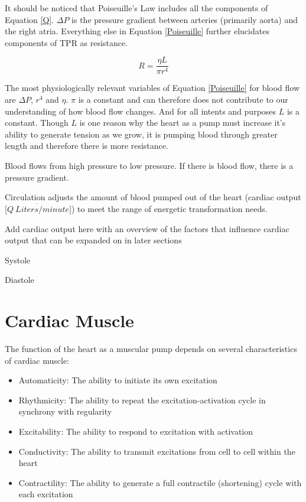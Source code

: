 It should be noticed that Poiseuille's Law includes all the components of Equation \ref{Q}. $\Delta P$ is the pressure gradient between arteries (primarily aorta) and the right atria. Everything else in Equation \ref{Poiseuille} further elucidates components of TPR as resistance.

\begin{equation}
    R = \frac{\eta L}{\pi r^4}
    \label{resistance}
\end{equation}

The most physiologically relevant variables of Equation \ref{Poiseuille} for blood flow are $\Delta P$, $r^4$ and $\eta$. $\pi$ is a constant and can therefore does not contribute to our understanding of how blood flow changes. And for all intents and purposes $L$ is a constant. Though $L$ is one reason why the heart as a pump must increase it's ability to generate tension as we grow, it is pumping blood through greater length and therefore there is more resistance. 


Blood flows from high pressure to low pressure. If there is blood flow, there is a pressure gradient. 


Circulation adjusts the amount of blood pumped out of the heart (cardiac output [$\dot{Q \ Liters/minute}$]) to meet the range of energetic transformation needs.


Add cardiac output here with an overview of the factors that influence cardiac output that can be expanded on in later sections

Systole

Diastole




\section{Cardiac Muscle}

The function of the heart as a muscular pump depends on several characteristics of cardiac muscle:

\begin{itemize}
    
    \item Automaticity: The ability to initiate its own excitation
    \item Rhythmicity: The ability to repeat the excitation-activation cycle in synchrony with regularity
    \item Excitability: The ability to respond to excitation with activation
    \item Conductivity: The ability to transmit excitations from cell to cell within the heart
    \item Contractility: The ability to generate a full contractile (shortening) cycle with each excitation
 
\end{itemize}

